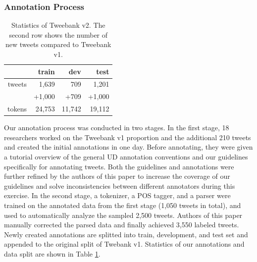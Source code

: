 \documentclass[11pt,a4paper]{article}
\begin{document}
\subsubsection{Annotation Process}
\begin{table}
	\centering
	\begin{tabular}{rrrr}
		\hline
		& train & dev & test \\
		\hline
		tweets 		&	1,639 		&	709		&	1,201\\
		& +1,000 & +709 & +1,000\\
		tokens 		&	24,753		&	11,742	&	19,112\\
		\hline
	\end{tabular}
\caption{Statistics of {\sc Tweebank v2}.
The second row shows the number of new tweets compared to
{\sc Tweebank v1}.\label{tbl:data-stat}
}
\end{table}
Our annotation process was conducted in two stages.
In the first stage, 18 researchers worked on the {\sc Tweebank v1}
proportion and the additional 210 tweets and created the initial annotations in one day.
Before annotating, they were given a tutorial overview of the general UD
annotation conventions and our guidelines specifically for annotating tweets.
Both the guidelines and annotations
were further refined by the authors of this paper to increase
the coverage of our guidelines and solve inconsistencies between
different annotators during this exercise. In the second stage, a tokenizer, a POS tagger, and a
parser were trained on the annotated data from the first stage (1,050 tweets in total),
and used to automatically analyze the sampled 2,500 tweets.  Authors 
of this paper manually corrected the parsed data and finally achieved 3,550 labeled tweets.
Newly created annotations are splitted into train, development, and test set and appended
to the original split of {\sc Twebank v1}. Statistics of our annotations and data split are shown
in Table \ref{tbl:data-stat}.
\end{document}
